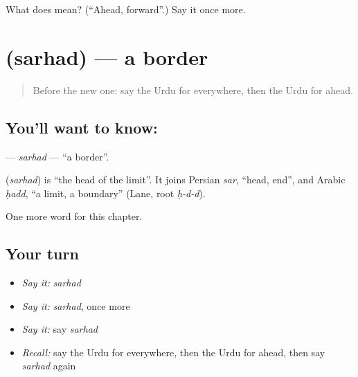 \begin{tcolorbox}[breakable,colback=teal!4,colframe=teal!35!black,title={Before you move on}]
What does  mean? (\textquotedblleft{}Ahead, forward\textquotedblright{}.) Say it once more.
\end{tcolorbox}
\section[\texorpdfstring{\ur{سرحد} (sarhad)}{سرحد (sarhad)}]{ (sarhad) — a border}

\label{lesson:UR-C246-sarhad}



\begin{quote}
Before the new one: say the Urdu for everywhere, then the Urdu for ahead.
\end{quote}

\subsection*{You'll want to know: }
\textbf{} — \emph{sarhad} — \textquotedblleft{}a border\textquotedblright{}.

\begin{cousinweb}
\textbf{} (\emph{sarhad}) is \textquotedblleft{}the head of the limit\textquotedblright{}. It joins Persian \emph{sar}, \textquotedblleft{}head, end\textquotedblright{}, and Arabic \emph{ḥadd}, \textquotedblleft{}a limit, a boundary\textquotedblright{} (Lane, root \emph{ḥ-d-d}).
\end{cousinweb}

\begin{grammarlens}[title={What you've built}]
One more word for this chapter.
\end{grammarlens}

\subsection*{Your turn}
\begin{itemize}
\raggedright
  \item \emph{Say it:} \emph{sarhad}
  \item \emph{Say it:} \emph{sarhad}, once more
  \item \emph{Say it:} say \emph{sarhad}
  \item \emph{Recall:} say the Urdu for everywhere, then the Urdu for ahead, then say \emph{sarhad} again
\end{itemize}

